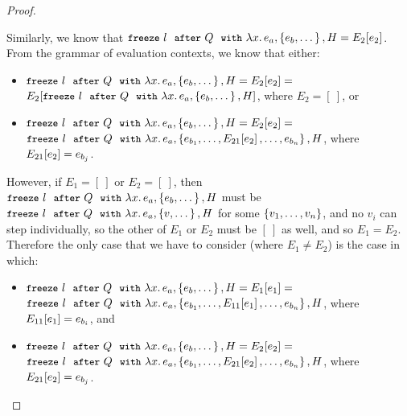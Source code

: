 \begin{proof}
\begin{itemize}
      Similarly, we know that $\freezeafterfull{l}{Q}{\lam{x}{e_a}}{\setof{e_b,
        \dots}}{H} = \evalctxt{E_2}{e_2}$.
      From the grammar of evaluation contexts, we know that either:
      \begin{itemize}
        \item $\freezeafterfull{l}{Q}{\lam{x}{e_a}}{\setof{e_b,
            \dots}}{H} = \evalctxt{E_2}{e_2} =$ \\
          $\evalctxt{E_2}{\freezeafterfull{l}{Q}{\lam{x}{e_a}}{\setof{e_b,
              \dots}}{H}}$, where $E_2 = [~]$, or
        \item $\freezeafterfull{l}{Q}{\lam{x}{e_a}}{\setof{e_b,
            \dots}}{H} = \evalctxt{E_2}{e_2} =$ \\
          $\freezeafterfull{l}{Q}{\lam{x}{e_a}}{\setof{e_{b_1}, \dots,
              \evalctxt{E_{21}}{e_2}, \dots, e_{b_n}}}{H}$, where
          $\evalctxt{E_{21}}{e_2} = e_{b_j}$.
      \end{itemize}

      However, if $E_1 = [~]$ or $E_2 = [~]$, then
      $\freezeafterfull{l}{Q}{\lam{x}{e_a}}{\setof{e_b, \dots}}{H}$
      must be $\freezeafterfull{l}{Q}{\lam{x}{e_a}}{\setof{v,
          \dots}}{H}$ for some $\setof{v_1, \dots, v_n}$, and no $v_i$
      can step individually, so the other of $E_1$ or $E_2$ must be
      $[~]$ as well, and so $E_1 = E_2$.  Therefore the only case that
      we have to consider (where $E_1 \neq E_2$) is the case in which:
      \begin{itemize}
        \item $\freezeafterfull{l}{Q}{\lam{x}{e_a}}{\setof{e_b,
            \dots}}{H} = \evalctxt{E_1}{e_1} =$ \\
          $\freezeafterfull{l}{Q}{\lam{x}{e_a}}{\setof{e_{b_1}, \dots,
              \evalctxt{E_{11}}{e_1}, \dots, e_{b_n}}}{H}$, where
          $\evalctxt{E_{11}}{e_1} = e_{b_i}$, and
        \item $\freezeafterfull{l}{Q}{\lam{x}{e_a}}{\setof{e_b,
            \dots}}{H} = \evalctxt{E_2}{e_2} =$ \\
          $\freezeafterfull{l}{Q}{\lam{x}{e_a}}{\setof{e_{b_1}, \dots,
              \evalctxt{E_{21}}{e_2}, \dots, e_{b_n}}}{H}$, where
          $\evalctxt{E_{21}}{e_2} = e_{b_j}$.
      \end{itemize}


\end{itemize}
\end{proof}
